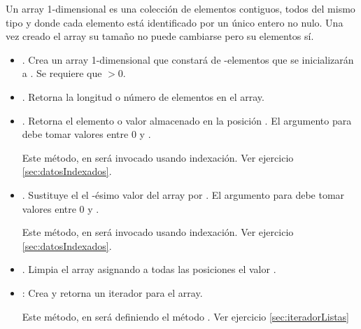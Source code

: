 




\begin{definition}{}\label{def:TDAArray1D}

Un array 1-dimensional es una colección de elementos contiguos, todos del mismo tipo y donde cada elemento está identificado por un único entero no nulo. Una vez creado el array su tamaño no puede cambiarse pero su elementos sí.
\begin{itemize}
\item {}. Crea un array 1-dimensional que constará de -elementos que se inicializarán a . Se requiere que $>0$.

\item {}. Retorna la longitud o número de elementos en el array.

\item {}. Retorna el elemento o valor almacenado en la posición . El argumento para  debe tomar valores entre 0 y .

Este método, en  será invocado usando indexación. Ver ejercicio \ref{sec:datosIndexados}.

\item {}. Sustituye el el -ésimo valor del array por . El argumento para  debe tomar valores entre 0 y .

Este método, en  será invocado usando indexación. Ver ejercicio \ref{sec:datosIndexados}.

\item {}. Limpia el array asignando a todas las posiciones el valor .

\item {}: Crea y retorna un iterador para el array.

Este método, en  será definiendo el método . Ver ejercicio 
\ref{sec:iteradorListas}
\end{itemize}
\end{definition}


